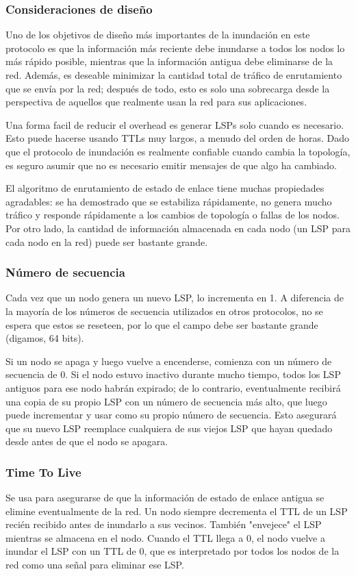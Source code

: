 \subsubsection{Consideraciones de diseño}
Uno de los objetivos de diseño más importantes de la inundación en este protocolo es que la información más reciente debe inundarse a todos los nodos lo más rápido posible, mientras que la información antigua debe eliminarse de la red. Además, es deseable minimizar la cantidad total de tráfico de enrutamiento que se envía por la red; después de todo, esto es solo una sobrecarga desde la perspectiva de aquellos que realmente usan la red para sus aplicaciones. 

Una forma facil de reducir el overhead es generar LSPs solo cuando es necesario. Esto puede hacerse usando TTLs muy largos, a menudo del orden de horas. Dado que el protocolo de inundación es realmente confiable cuando cambia la topología, es seguro asumir que no es necesario emitir mensajes de que algo ha cambiado.

El algoritmo de enrutamiento de estado de enlace tiene muchas propiedades agradables: se ha demostrado que se estabiliza rápidamente, no genera mucho tráfico y responde rápidamente a los cambios de topología o fallas de los nodos. Por otro lado, la cantidad de información almacenada en cada nodo (un LSP para cada nodo en la red) puede ser bastante grande.

\subsubsection{Número de secuencia}
Cada vez que un nodo genera un nuevo LSP, lo incrementa en 1. A diferencia de la mayoría de los números de secuencia utilizados en otros protocolos, no se espera que estos se reseteen, por lo que el campo debe ser bastante grande (digamos, 64 bits). 

Si un nodo se apaga y luego vuelve a encenderse, comienza con un número de secuencia de 0. Si el nodo estuvo inactivo durante mucho tiempo, todos los LSP antiguos para ese nodo habrán expirado; de lo contrario, eventualmente recibirá una copia de su propio LSP con un número de secuencia más alto, que luego puede incrementar y usar como su propio número de secuencia. Esto asegurará que su nuevo LSP reemplace cualquiera de sus viejos LSP que hayan quedado desde antes de que el nodo se apagara.

\subsubsection{Time To Live}
Se usa para asegurarse de que la información de estado de enlace antigua se elimine eventualmente de la red. Un nodo siempre decrementa el TTL de un LSP recién recibido antes de inundarlo a sus vecinos. También "envejece" el LSP mientras se almacena en el nodo. Cuando el TTL llega a 0, el nodo vuelve a inundar el LSP con un TTL de 0, que es interpretado por todos los nodos de la red como una señal para eliminar ese LSP.

